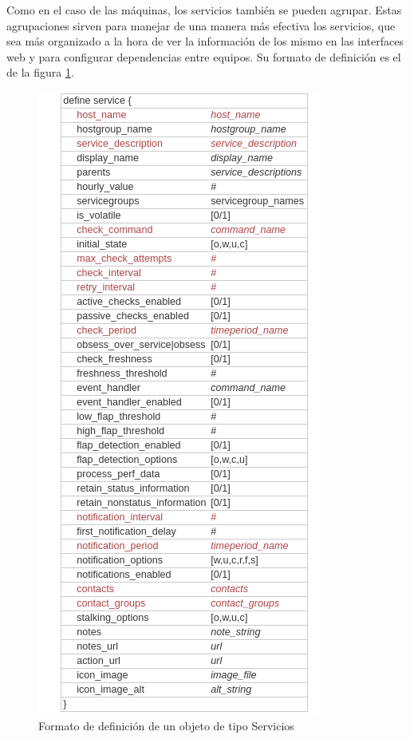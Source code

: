 Como en el caso de las máquinas, los servicios también se pueden agrupar. Estas agrupaciones sirven para manejar de una manera más efectiva los servicios, que sea más organizado a la hora de ver la información de los mismo en las interfaces web y para configurar dependencias entre equipos.
Su formato de definición es el de la figura \ref{define-services}.
\begin{figure}[H]
	\centering
	\includegraphics[scale=0.4]{imagenes/definicion_objetos/services.png}
	\caption{Formato de definición de un objeto de tipo Servicios} \label{define-services}
\end{figure}

